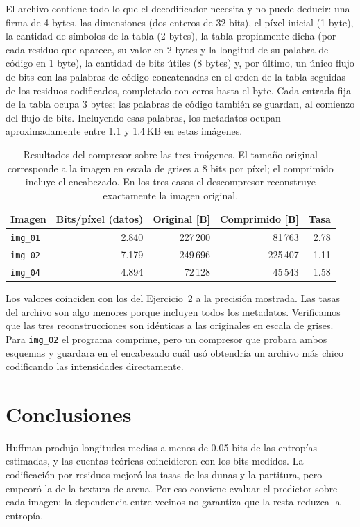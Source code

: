 \documentclass[11pt,a4paper]{article}
\newcommand{\img}[1]{\texttt{img\_#1}}
\begin{document}
El archivo contiene todo lo que el decodificador necesita y no puede deducir: una firma de 4 bytes,
las dimensiones (dos enteros de 32 bits), el píxel inicial (1 byte), la cantidad de símbolos de la
tabla (2 bytes), la tabla propiamente dicha (por cada residuo que aparece, su valor en 2 bytes y la
longitud de su palabra de código en 1 byte), la cantidad de bits útiles (8 bytes) y, por último, un
único flujo de bits con las palabras de código concatenadas en el orden de la tabla seguidas de los
residuos codificados, completado con ceros hasta el byte. Cada entrada fija de la tabla ocupa
3 bytes; las palabras de código también se guardan, al comienzo del flujo de bits. Incluyendo esas
palabras, los metadatos ocupan aproximadamente entre 1.1 y 1.4\,KB en estas imágenes.

\begin{table}[H]
  \centering
  \caption{Resultados del compresor sobre las tres imágenes. El tamaño original corresponde a la
  imagen en escala de grises a 8 bits por píxel; el comprimido incluye el encabezado. En los tres casos
  el descompresor reconstruye exactamente la imagen original.}
  \label{tab:ej4}
  \begin{tabular}{lrrrr}
    \toprule
    Imagen & Bits/píxel (datos) & Original [B] & Comprimido [B] & Tasa \\
    \midrule
    \img{01} & 2.840 & 227\,200 &  81\,763 & 2.78 \\
    \img{02} & 7.179 & 249\,696 & 225\,407 & 1.11 \\
    \img{04} & 4.894 &  72\,128 &  45\,543 & 1.58 \\
    \bottomrule
  \end{tabular}
\end{table}

Los valores coinciden con los del Ejercicio~2 a la precisión mostrada. Las tasas del archivo son
algo menores porque incluyen todos los metadatos. Verificamos que las tres reconstrucciones son idénticas a las
originales en escala de grises. Para \img{02} el programa comprime, pero un compresor que probara
ambos esquemas y guardara en el encabezado cuál usó obtendría un archivo más chico codificando las
intensidades directamente.

\section{Conclusiones}
Huffman produjo longitudes medias a menos de 0.05 bits de las entropías estimadas, y las cuentas
teóricas coincidieron con los bits medidos. La codificación por residuos mejoró las tasas de las
dunas y la partitura, pero empeoró la de la textura de arena. Por eso conviene evaluar el predictor
sobre cada imagen: la dependencia entre vecinos no garantiza que la resta reduzca la entropía.
\end{document}
